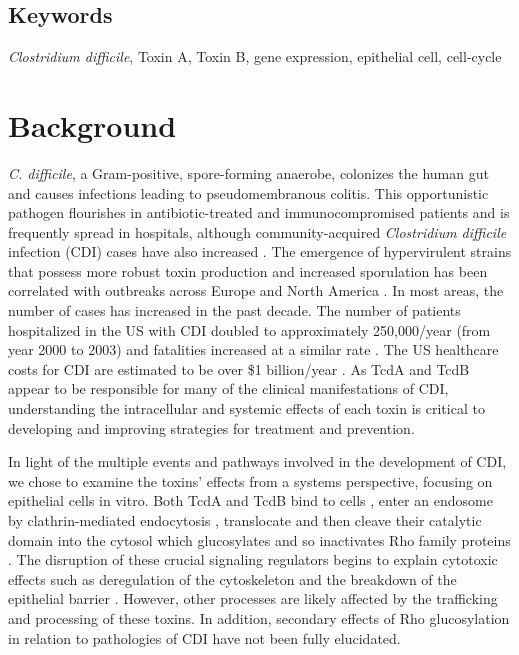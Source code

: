 \subsection{Keywords}
\textit{Clostridium difficile}, Toxin A, Toxin B, gene expression, epithelial cell, cell-cycle

\section{Background}
\textit{C. difficile}, a Gram-positive, spore-forming anaerobe, colonizes the human gut and causes infections leading to pseudomembranous colitis.  This opportunistic pathogen flourishes in antibiotic-treated and immunocompromised patients and is frequently spread in hospitals, although community-acquired \textit{Clostridium difficile} infection (CDI) cases have also increased \cite{Freeman:2010bv}. The emergence of hypervirulent strains that possess more robust toxin production and increased sporulation has been correlated with outbreaks across Europe and North America \cite{Warny:2005kd}. In most areas, the number of cases has increased in the past decade. The number of patients hospitalized in the US with CDI doubled to approximately 250,000/year (from year 2000 to 2003) and fatalities increased at a similar rate \cite{Zilberberg:2008gd}. The US healthcare costs for CDI are estimated to be over \$1 billion/year \cite{Dubberke:2009ic}. As TcdA and TcdB appear to be responsible for many of the clinical manifestations of CDI, understanding the intracellular and systemic effects of each toxin is critical to developing and improving strategies for treatment and prevention.

In light of the multiple events and pathways involved in the development of CDI, we chose to examine the toxins’ effects from a systems perspective, focusing on epithelial cells in vitro. Both TcdA and TcdB bind to cells \cite{Frisch:2003jo}, enter an endosome by clathrin-mediated endocytosis \cite{Papatheodorou:2010io}, translocate and then cleave their catalytic domain into the cytosol which glucosylates and so inactivates Rho family proteins \cite{Egerer:2007fy}. The disruption of these crucial signaling regulators begins to explain cytotoxic effects such as deregulation of the cytoskeleton and the breakdown of the epithelial barrier \cite{Nusrat:2001cs}. However, other processes are likely affected by the trafficking and processing of these toxins. In addition, secondary effects of Rho glucosylation in relation to pathologies of CDI have not been fully elucidated.

